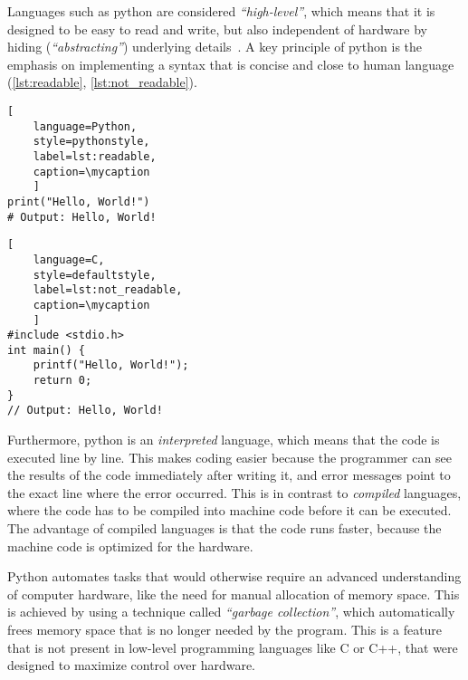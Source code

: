 Languages such as python are considered \textit{``high-level''}, which means
that it is designed to be easy to read and write, but also independent of
hardware by hiding (\textit{``abstracting''}) underlying
details~\cite{PythonLanguageReference}. A key principle of python is the
emphasis on implementing a syntax that is concise and close to human language
(\autoref{lst:readable}, \autoref{lst:not_readable}). \def\mycaption{ Example of
    readable python code. This one-line code returns the words (string)
    \texttt{'Hello, World!'} when executed. The command is straightforward and easy
    to understand.}
\begin{lstlisting}[
    language=Python, 
    style=pythonstyle,
    label=lst:readable,
    caption=\mycaption
    ]
print("Hello, World!")
# Output: Hello, World!
\end{lstlisting}

\def\mycaption{ Example of less readable code written in the low-level
    programming language C. This code is doing exactly the same as the python
    code in \autoref{lst:readable}. The command is harder to understand because
    more steps are needed to access the same functionality, including the
    definition of a function}
\begin{lstlisting}[
    language=C, 
    style=defaultstyle,
    label=lst:not_readable, 
    caption=\mycaption
    ]
#include <stdio.h>
int main() {
    printf("Hello, World!");
    return 0;
}
// Output: Hello, World!
\end{lstlisting}

Furthermore, python is an \textit{interpreted} language, which means that the
code is executed line by line. This makes coding easier because the programmer
can see the results of the code immediately after writing it, and error messages
point to the exact line where the error occurred. This is in contrast to
\textit{compiled} languages, where the code has to be compiled into machine code
before it can be executed. The advantage of compiled languages is that the code
runs faster, because the machine code is optimized for the hardware.

Python automates tasks that would otherwise require an advanced understanding of
computer hardware, like the need for manual allocation of memory space. This is
achieved by using a technique called \textit{``garbage collection''}, which
automatically frees memory space that is no longer needed by the program. This
is a feature that is not present in low-level programming languages like C or
C++, that were designed to maximize control over hardware.

